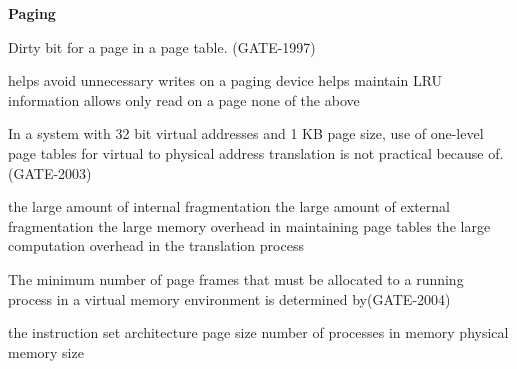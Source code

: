
\centerline{\textbf{ \LARGE Paging}}



\begin{questyle}

  \question Dirty bit for a page in a page table. (GATE-1997)

  \begin{choices}
    \choice helps avoid unnecessary writes on a paging device
    \choice helps maintain LRU information
    \choice allows only read on a page
    \choice none of the above
  \end{choices}
\end{questyle}



\begin{questyle}

  \question In a system with 32 bit virtual addresses and 1 KB page size, use of one-level page tables for virtual to
            physical address translation is not practical because of. (GATE-2003)

  \begin{choices}
    \choice the large amount of internal fragmentation
    \choice the large amount of external fragmentation
    \choice the large memory overhead in maintaining page tables
    \choice  the large computation overhead in the translation process
  \end{choices}

\end{questyle}


\begin{questyle}

  \question  The minimum number of page frames that must be allocated to a running process in a virtual memory
            environment is determined by(GATE-2004)

  \begin{choices}
    \choice the instruction set architecture
    \choice page size
    \choice number of processes in memory
    \choice physical memory size
  \end{choices}

\end{questyle}


